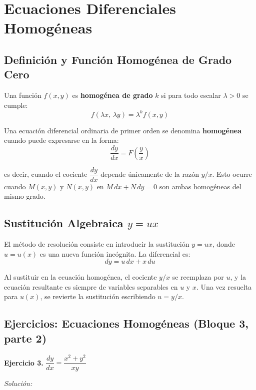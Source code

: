 \documentclass[12pt,letterpaper]{report}
\numberwithin{equation}{chapter}
\numberwithin{figure}{chapter}
\numberwithin{table}{chapter}
\begin{document}

\section{Ecuaciones Diferenciales Homogéneas}

\subsection{Definición y Función Homogénea de Grado Cero}

Una función $f(x,y)$ es \textbf{homogénea de grado} $k$ si para todo escalar $\lambda > 0$ se cumple:
\begin{equation*}
f(\lambda x,\, \lambda y) = \lambda^k f(x,y)
\end{equation*}

Una ecuación diferencial ordinaria de primer orden se denomina \textbf{homogénea} cuando puede expresarse en la forma:
\begin{equation*}
\dfrac{dy}{dx} = F\!\left(\dfrac{y}{x}\right)
\end{equation*}

es decir, cuando el cociente $\dfrac{dy}{dx}$ depende únicamente de la razón $y/x$. Esto ocurre cuando $M(x,y)$ y $N(x,y)$ en $M\,dx + N\,dy = 0$ son ambas homogéneas del mismo grado.

\subsection{Sustitución Algebraica $y = ux$}

El método de resolución consiste en introducir la sustitución $y = ux$, donde $u = u(x)$ es una nueva función incógnita. La diferencial es:
\[
dy = u\,dx + x\,du
\]

Al sustituir en la ecuación homogénea, el cociente $y/x$ se reemplaza por $u$, y la ecuación resultante es siempre de variables separables en $u$ y $x$. Una vez resuelta para $u(x)$, se revierte la sustitución escribiendo $u = y/x$.

\subsection{Ejercicios: Ecuaciones Homogéneas (Bloque 3, parte 2)}

\textbf{Ejercicio 3.} $\dfrac{dy}{dx} = \dfrac{x^2 + y^2}{xy}$

\textit{Solución:}
\end{document}

